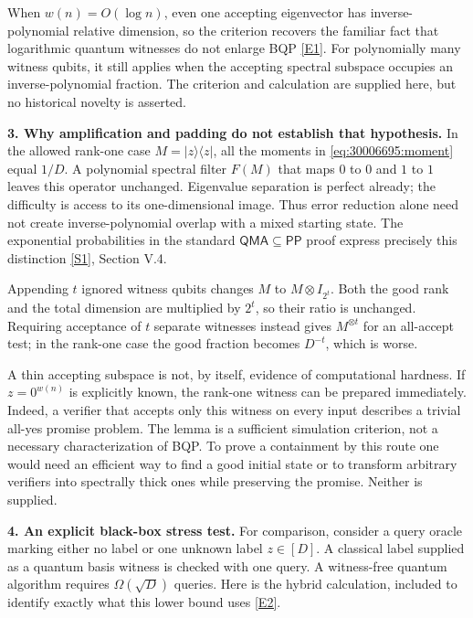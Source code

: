 \documentclass[11pt,a4paper]{article}
\newcommand{\sref}[2]{\hyperlink{source:#1:#2}{[S#2]}}
\newcommand{\eref}[2]{\hyperlink{extra:#1:#2}{[E#2]}}
\numberwithin{equation}{section}
\begin{document}
When $w(n)=O(\log n)$, even one accepting eigenvector has inverse-polynomial
relative dimension, so the criterion recovers the familiar fact that
logarithmic quantum witnesses do not enlarge BQP \eref{30006695}{1}. For
polynomially many witness qubits, it still applies when the accepting
spectral subspace occupies an inverse-polynomial fraction. The criterion
and calculation are supplied here, but no historical novelty is asserted.

\textbf{3. Why amplification and padding do not establish that hypothesis.}
In the allowed rank-one case $M=|z\rangle\langle z|$, all the moments in
\eqref{eq:30006695:moment} equal $1/D$. A polynomial spectral filter $F(M)$
that maps $0$ to $0$ and $1$ to $1$ leaves this operator unchanged.
Eigenvalue separation is perfect already; the difficulty is access to its
one-dimensional image. Thus error reduction alone need not create
inverse-polynomial overlap with a mixed starting state. The exponential
probabilities in the standard $\mathsf{QMA}\subseteq\mathsf{PP}$ proof
express precisely this distinction \sref{30006695}{1}, Section V.4.

Appending $t$ ignored witness qubits changes $M$ to $M\otimes I_{2^t}$.
Both the good rank and the total dimension are multiplied by $2^t$, so
their ratio is unchanged. Requiring acceptance of $t$ separate witnesses
instead gives $M^{\otimes t}$ for an all-accept test; in the rank-one case
the good fraction becomes $D^{-t}$, which is worse.

A thin accepting subspace is not, by itself, evidence of computational
hardness. If $z=0^{w(n)}$ is explicitly known, the rank-one witness can be
prepared immediately. Indeed, a verifier that accepts only this witness on
every input describes a trivial all-yes promise problem. The lemma is a
sufficient simulation criterion, not a necessary characterization of BQP.
To prove a containment by this route one would need an efficient way to
find a good initial state or to transform arbitrary verifiers into
spectrally thick ones while preserving the promise. Neither is supplied.

\textbf{4. An explicit black-box stress test.}
For comparison, consider a query oracle marking either no label or one
unknown label $z\in[D]$. A classical label supplied as a quantum basis
witness is checked with one query. A witness-free quantum algorithm requires
$\Omega(\sqrt D)$ queries. Here is the hybrid calculation, included to
identify exactly what this lower bound uses \eref{30006695}{2}.
\end{document}
